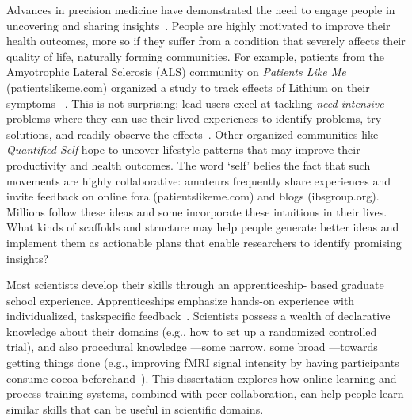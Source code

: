 Advances in precision medicine have demonstrated the need
to engage people in uncovering and sharing insights~\cite{Aronson2015}. People
are highly motivated to improve their health outcomes,
more so if they suffer from a condition that severely affects
their quality of life, naturally forming communities. For example,
patients from the Amyotrophic Lateral Sclerosis
(ALS) community on \textit{Patients Like Me} (patientslikeme.com)
organized a study to track effects of Lithium on their symptoms
~\cite{Wicks2011}. This is not surprising; lead users excel at tackling
\textit{need-intensive} problems where they can use their lived
experiences to identify problems, try solutions, and readily
observe the effects~\cite{VonHippel2005}. Other organized communities like
\textit{Quantified Self} hope to uncover lifestyle patterns that may
improve their productivity and health outcomes. The word
‘self’ belies the fact that such movements are highly collaborative:
amateurs frequently share experiences and invite
feedback on online fora (patientslikeme.com) and blogs
(ibsgroup.org). Millions follow these ideas and some incorporate
these intuitions in their lives. What kinds of scaffolds
and structure may help people generate better ideas and implement them as actionable plans that
enable researchers to identify promising insights?


Most scientists develop their skills through an apprenticeship-
based graduate school experience. Apprenticeships emphasize
hands-on experience with individualized, taskspecific
feedback~\cite{schon1984reflective}. Scientists possess a wealth of declarative
knowledge about their domains (e.g., how to set up a
randomized controlled trial), and also procedural knowledge
—some narrow, some broad —towards getting things done
(e.g., improving fMRI signal intensity by having participants
consume cocoa beforehand~\cite{Francis2006}). This dissertation explores how
online learning and process training systems, combined with
peer collaboration, can help people learn similar skills that
can be useful in scientific domains.

